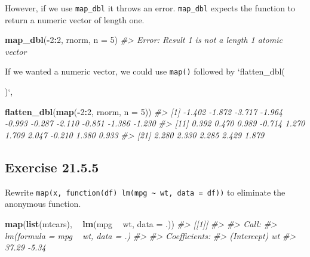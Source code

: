 \documentclass[]{book}
\newenvironment{Shaded}{\begin{snugshade}}{\end{snugshade}}
\newcommand{\CommentTok}[1]{\textcolor[rgb]{0.56,0.35,0.01}{\textit{#1}}}
\newcommand{\DataTypeTok}[1]{\textcolor[rgb]{0.13,0.29,0.53}{#1}}
\newcommand{\DecValTok}[1]{\textcolor[rgb]{0.00,0.00,0.81}{#1}}
\newcommand{\KeywordTok}[1]{\textcolor[rgb]{0.13,0.29,0.53}{\textbf{#1}}}
\newcommand{\NormalTok}[1]{#1}
\newcommand{\OperatorTok}[1]{\textcolor[rgb]{0.81,0.36,0.00}{\textbf{#1}}}
\newcommand{\StringTok}[1]{\textcolor[rgb]{0.31,0.60,0.02}{#1}}
\theoremstyle{plain}
\theoremstyle{remark}
\theoremstyle{definition}
\theoremstyle{definition}
\theoremstyle{definition}
\theoremstyle{remark}
\begin{document}
However, if we use \texttt{map\_dbl} it throws an error.
\texttt{map\_dbl} expects the function to return a numeric vector of
length one.

\begin{Shaded}
\begin{Highlighting}[]
\KeywordTok{map_dbl}\NormalTok{(}\OperatorTok{-}\DecValTok{2}\OperatorTok{:}\DecValTok{2}\NormalTok{, rnorm, }\DataTypeTok{n =} \DecValTok{5}\NormalTok{)}
\CommentTok{#> Error: Result 1 is not a length 1 atomic vector}
\end{Highlighting}
\end{Shaded}

If we wanted a numeric vector, we could use \texttt{map()} followed by
`flatten\_dbl(

)`,

\begin{Shaded}
\begin{Highlighting}[]
\KeywordTok{flatten_dbl}\NormalTok{(}\KeywordTok{map}\NormalTok{(}\OperatorTok{-}\DecValTok{2}\OperatorTok{:}\DecValTok{2}\NormalTok{, rnorm, }\DataTypeTok{n =} \DecValTok{5}\NormalTok{))}
\CommentTok{#>  [1] -1.402 -1.872 -3.717 -1.964 -0.993 -0.287 -2.110 -0.851 -1.386 -1.230}
\CommentTok{#> [11]  0.392  0.470  0.989 -0.714  1.270  1.709  2.047 -0.210  1.380  0.933}
\CommentTok{#> [21]  2.280  2.330  2.285  2.429  1.879}
\end{Highlighting}
\end{Shaded}

\hypertarget{exercise-21.5.5}{%
\subsection*{\texorpdfstring{Exercise
{21.5.5}}{Exercise 21.5.5}}\label{exercise-21.5.5}}

Rewrite
\texttt{map(x,\ function(df)\ lm(mpg\ \textasciitilde{}\ wt,\ data\ =\ df))}
to eliminate the anonymous function.

\begin{Shaded}
\begin{Highlighting}[]
\KeywordTok{map}\NormalTok{(}\KeywordTok{list}\NormalTok{(mtcars), }\OperatorTok{~}\StringTok{ }\KeywordTok{lm}\NormalTok{(mpg }\OperatorTok{~}\StringTok{ }\NormalTok{wt, }\DataTypeTok{data =}\NormalTok{ .))}
\CommentTok{#> [[1]]}
\CommentTok{#> }
\CommentTok{#> Call:}
\CommentTok{#> lm(formula = mpg ~ wt, data = .)}
\CommentTok{#> }
\CommentTok{#> Coefficients:}
\CommentTok{#> (Intercept)           wt  }
\CommentTok{#>       37.29        -5.34}
\end{Highlighting}
\end{Shaded}
\end{document}
